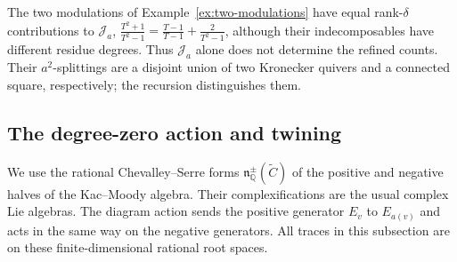 \documentclass[11pt, reqno]{amsart}
\numberwithin{equation}{section}
\theoremstyle{definition}
\theoremstyle{remark}
\newcommand{\mb}[1]{\mathbb{#1}}
\newcommand{\mc}[1]{\mathcal{#1}}
\begin{document}
The two modulations of Example~\ref{ex:two-modulations} have equal
rank-$\delta$ contributions to $\mc J_a$,
$\frac{T^2+1}{T^2-1}=\frac{T-1}{T-1}+\frac{2}{T^2-1}$, although their
indecomposables have different residue degrees. Thus $\mc J_a$
alone does not determine the refined counts. Their $a^2$-splittings
are a disjoint union of two Kronecker quivers and a connected square,
respectively; the recursion distinguishes them.

\subsection{The degree-zero action and twining}

We use the rational Chevalley--Serre forms
$\mathfrak n_{\mb Q}^{\pm}(\widetilde C)$ of the positive and
negative halves of the Kac--Moody algebra. Their complexifications
are the usual complex Lie algebras. The diagram action sends the
positive generator $E_v$ to $E_{a(v)}$ and acts in the same way on the
negative generators. All traces in this subsection are on these
finite-dimensional rational root spaces.
\end{document}
